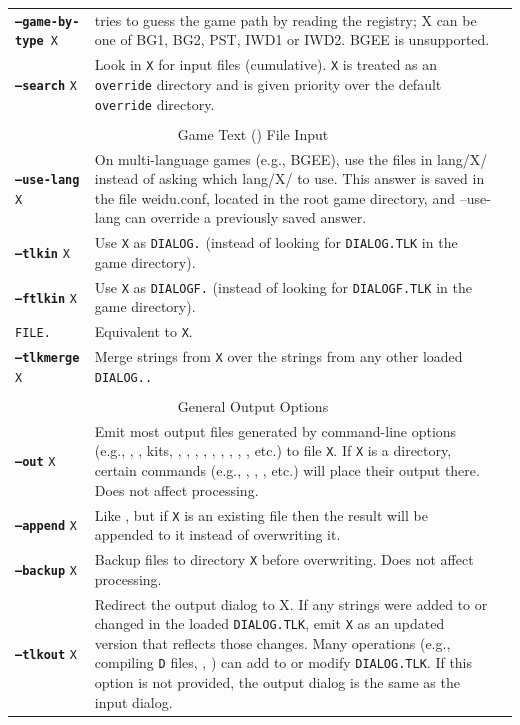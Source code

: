 \documentclass{article}
\def\ttref#1{\ahrefloc{#1}{\tt #1}}
\def\DEFINE#1{{\tt \bf #1}\label{#1}\index{#1}}
\def\t#1{{\tt #1}}
\begin{document}
\begin{tabular}{lp{10in}|p{10in}}
{\tt \DEFINE{--game-by-type} X} & tries to guess the game path by reading
the registry; X can be one of BG1, BG2, PST, IWD1 or IWD2. BGEE is unsupported.
\\
\DEFINE{--search} \t{X}	& Look in {\tt X} for input files (cumulative).
\t{X} is treated as an \t{override} directory and is given priority over
the default \t{override} directory. \\
\\
\multicolumn{2}{c}{ \color{red} Game Text (\ttref{TLK}) File Input} \\
\DEFINE{--use-lang} \t{X} & On multi-language games (e.g., BGEE), use
the files in lang/X/ instead of asking which lang/X/ to use. This
answer is saved in the file weidu.conf, located in the root game
directory, and --use-lang can override a previously saved answer.\\
\DEFINE{--tlkin} \t{X} & Use {\tt X} as {\tt DIALOG.}\ttref{TLK} (instead
of looking for \t{DIALOG.TLK} in the game directory). \\
\DEFINE{--ftlkin} \t{X} & Use {\tt X} as {\tt DIALOGF.}\ttref{TLK} (instead
of looking for \t{DIALOGF.TLK} in the game directory). \\
\tt{FILE.}\ttref{TLK} & Equivalent to \ttref{--tlkin} \t{X}. \\
\DEFINE{--tlkmerge} \t{X}	& Merge strings from {\tt X} over the strings from any other loaded {\tt \t{DIALOG.}\ttref{TLK}.} \\
\\
\multicolumn{2}{c}{ \color{red} General Output Options} \\
\DEFINE{--out} \t{X} &	Emit most output files generated by command-line
options (e.g., \ttref{D}, \ttref{DLG}, kits, \ttref{--biff-get},
\ttref{BAF}, \ttref{BCS}, \ttref{--automate}, \ttref{--traify-tlk},
\ttref{--extract-kits}, \ttref{--list-biffs}, \ttref{--cmp-from},
\ttref{--dcmp-from}, etc.) to file {\tt X}. If \t{X} is a directory,
certain commands (e.g., \ttref{D}, \ttref{DLG}, \ttref{--biff-get}, etc.)
will place their output there.  Does not affect \ttref{TP2} processing. \\
\DEFINE{--append} \t{X} & Like \ttref{--out}, but if \t{X} is an existing
file then the result will be appended to it instead of overwriting it. \\
\DEFINE{--backup} \t{X} &	Backup files to directory {\tt X} before overwriting. Does not affect \ttref{TP2} processing. \\
\DEFINE{--tlkout} \t{X} & Redirect the output dialog to X. If any strings were added to or changed in the loaded \t{DIALOG.TLK}, emit \t{X} as an updated version that reflects those changes. Many operations (e.g., compiling \t{D} files, \ttref{--tlkmerge}, \ttref{STRING_SET}) can add to or modify \t{DIALOG.TLK}. If this option is not provided, the output dialog is the same as the input dialog. \\

\end{tabular}
\end{document}
